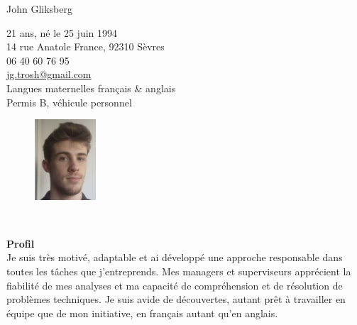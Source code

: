 {\Large John \sc Gliksberg}
\hrulefill\\[-.47cm]
\begin{minipage}{0.8\textwidth}
\begin{flushleft}
\vspace{.5cm}
21 ans, né le 25 juin 1994\\
14 rue Anatole France, 92310 Sèvres\\[.2cm]
06 40 60 76 95\\
\href{mailto:jg.trosh@gmail.com}
{jg.trosh@gmail.com}\\[.2cm]
Langues maternelles français \& anglais\\
Permis B, véhicule personnel
\end{flushleft}
\end{minipage}%
\begin{minipage}{0.2\textwidth}
\begin{figure}[H]
\begin{flushright}
\includegraphics[height=3cm]{johnpic}
\end{flushright}
\end{figure}
\end{minipage}\\

\begin{center}
\end{center}
\vspace{.3cm}

{\large\bf Profil}
\hrulefill\\[.3cm]
{\setlength{\extrarowheight}{.2cm}
Je suis très motivé, adaptable et ai développé une approche responsable
dans toutes les tâches que j'entreprends.
Mes managers et superviseurs apprécient la fiabilité de mes analyses
et ma capacité de compréhension et de résolution de problèmes techniques.
Je suis avide de découvertes, autant prêt à travailler en équipe que
de mon initiative, en français autant qu'en anglais.
}
\vspace{.3cm}

